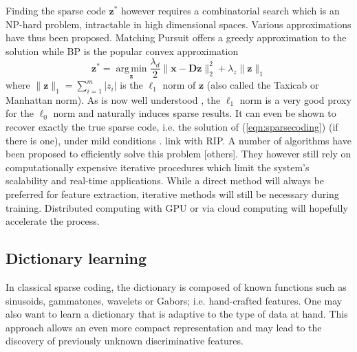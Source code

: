 \documentclass[a4paper,12pt,twoside]{report}
\newcommand{\eqnref}[1]{(\ref{#1})}  %
\DeclareMathOperator*{\argminop}{arg\,min}
\newcommand{\argmin}[1]{\argminop\limits_{#1}}
\newcommand{\normT}[1]{\| #1 \|_2^2}
\newcommand{\normO}[1]{\| #1 \|_1}
\newcommand{\D}{\mathbf{D}}
\newcommand{\x}{\mathbf{x}}
\newcommand{\z}{\mathbf{z}}
\begin{document}
Finding the sparse code $\z^*$ however requires a combinatorial search which is an NP-hard problem, intractable in high dimensional spaces. Various approximations have thus been proposed. Matching Pursuit \cite{mallat1993MatchingPursuit} offers a greedy approximation to the solution while \gls{BP} \cite{chen1998BasisPursuit} is the popular convex approximation
\begin{equation}\label{eqn:basispursuit}
	\z^* = \argmin{\z} \frac{\lambda_d}{2} \normT{\x - \D \z} + \lambda_z \normO{\z}
\end{equation}
where $\normO{\z} = \sum_{i=1}^{m} |z_i|$ is the $\ell_1$ norm of $\z$ (also called the Taxicab or Manhattan norm). As is now well understood \cite{candes2005CS, donoho2006CS}, the $\ell_1$ norm is a very good proxy for the $\ell_0$ norm and naturally induces sparse results. It can even be shown to recover exactly the true sparse code, i.e. the solution of \eqnref{eqn:sparsecoding} (if there is one), under mild conditions \cite{donoho2003OptSparse}. {\color{red}link with \gls{RIP}}. A number of algorithms have been proposed to efficiently solve this problem \cite{chen1998BasisPursuit, beck2009FISTA, ng2006EfficientSparse, li2009Coordinate} {\color{red} [others]}. They however still rely on computationally expensive iterative procedures which limit the system's scalability and real-time applications. While a direct method will always be preferred for feature extraction, iterative methods will still be necessary during training. Distributed computing with \gls{GPU} or via cloud computing will hopefully accelerate the process.

\subsection{Dictionary learning}

In classical sparse coding, the dictionary is composed of known functions such as sinusoids, gammatones, wavelets or Gabors; i.e. hand-crafted features. One may also want to learn a dictionary that is adaptive to the type of data at hand. This approach allows an even more compact representation and may lead to the discovery of previously unknown discriminative features.
\end{document}
